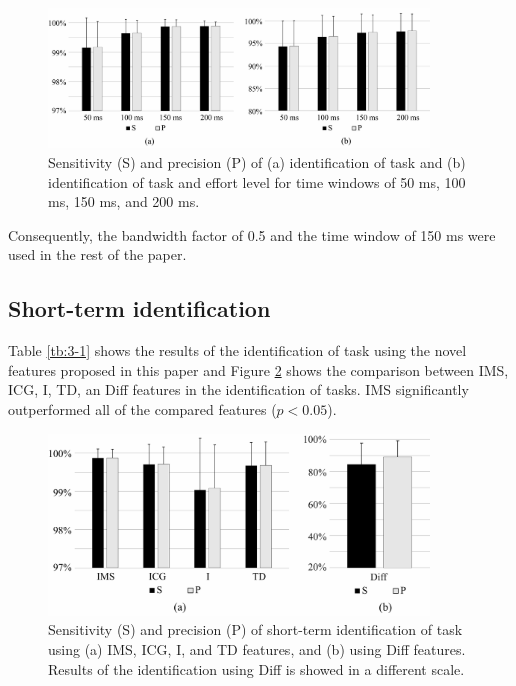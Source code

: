 \begin{figure}[ht]
\centering
\includegraphics[width=0.9\textwidth]{Images/figure3_5.png}
\caption{Sensitivity (S) and precision (P) of (a) identification of task and (b) identification of task and effort level for time windows of 50 ms, 100 ms, 150 ms, and 200 ms.}
\label{fig:3-5}
\end{figure}   

Consequently, the bandwidth factor of 0.5 and the time window of 150 ms were used in the rest of the paper.

\subsection{Short-term identification}
Table \ref{tb:3-1} shows the results of the identification of task using the novel features proposed in this paper and Figure \ref{fig:3-6} shows the comparison between IMS, ICG, I, TD, an Diff features in the identification of tasks. IMS significantly outperformed all of the compared features ($p < 0.05$).

\begin{figure}[ht]
\centering
\includegraphics[width=0.9\textwidth]{Images/figure3_6.png}
\caption{Sensitivity (S) and precision (P) of short-term identification of task using (a) IMS, ICG, I, and TD features, and (b) using Diff features. Results of the identification using Diff is showed in a different scale.}
\label{fig:3-6}
\end{figure}   

